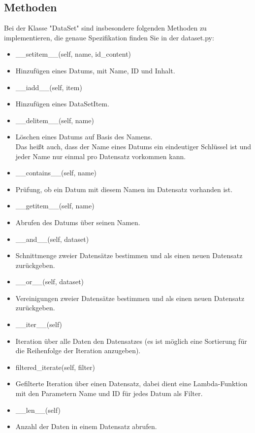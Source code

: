 \documentclass{article}
\begin{document}
\subsection{Methoden}
Bei der Klasse "DataSet" sind insbesondere folgenden Methoden zu implementieren, die genaue Spezifikation finden Sie in der \dq dataset.py\dq{}:
\begin{itemize}
    \item \_\_setitem\_\_(self, name, id\_content)
    \item[ ] Hinzufügen eines Datums, mit Name, ID und Inhalt.
    \item \_\_iadd\_\_(self, item)
    \item[] Hinzufügen eines \dq DataSetItem\dq{}. 
    \item \_\_delitem\_\_(self, name)
    \item[]  Löschen eines Datums auf Basis des Namens. \\ Das heißt auch, dass der Name eines Datums ein eindeutiger Schlüssel ist und jeder Name nur einmal pro Datensatz vorkommen kann.
    \item \_\_contains\_\_(self, name)
    \item[] Prüfung, ob ein Datum mit diesem Namen im Datensatz vorhanden ist.
    \item \_\_getitem\_\_(self, name)
    \item[] Abrufen des Datums über seinen Namen.
    \item \_\_and\_\_(self, dataset)
    \item[] Schnittmenge zweier Datensätze bestimmen und als einen neuen Datensatz zurückgeben.
    \item \_\_or\_\_(self, dataset)
    \item[] Vereinigungen zweier Datensätze bestimmen und als einen neuen Datensatz zurückgeben.
    \item \_\_iter\_\_(self)
    \item[] Iteration über alle Daten den Datensatzes (es ist möglich eine Sortierung für die Reihenfolge der Iteration anzugeben).
    \item filtered\_iterate(self, filter)
    \item[] Gefilterte Iteration über einen Datensatz, dabei dient eine Lambda-Funktion mit den Parametern Name und ID für jedes Datum als Filter.
    \item \_\_len\_\_(self)
    \item[] Anzahl der Daten in einem Datensatz abrufen.
\end{itemize}
\end{document}
